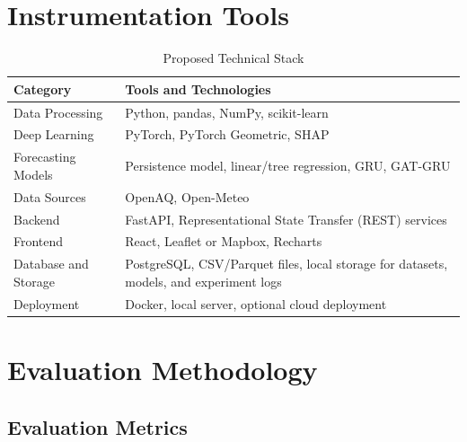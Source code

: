 \section{Instrumentation Tools}
\begin{table}[H]
    \centering
    \small
    \caption{Proposed Technical Stack}
    \label{tab:technical_stack}
    \renewcommand{\arraystretch}{1.2}
    \setlength{\tabcolsep}{4pt}

    \begin{tabularx}{0.94\linewidth}{|
        >{\raggedright\arraybackslash}p{3.0cm}|
        >{\raggedright\arraybackslash}X|}
        \hline
        \textbf{Category} & \textbf{Tools and Technologies} \\
        \hline

        Data Processing &
        Python, pandas, NumPy, scikit-learn \\
        \hline

        Deep Learning &
        PyTorch, PyTorch Geometric, SHAP \\
        \hline

        Forecasting Models &
        Persistence model, linear/tree regression, GRU, GAT-GRU \\
        \hline

        Data Sources &
        OpenAQ, Open-Meteo \\
        \hline

        Backend &
        FastAPI, Representational State Transfer (REST) services \\
        \hline

        Frontend &
        React, Leaflet or Mapbox, Recharts \\
        \hline

        Database and Storage &
        PostgreSQL, CSV/Parquet files, local storage for datasets, models, and experiment logs \\
        \hline

        Deployment &
        Docker, local server, optional cloud deployment \\
        \hline
    \end{tabularx}
\end{table}

\section{Evaluation Methodology}

\subsection{Evaluation Metrics}

